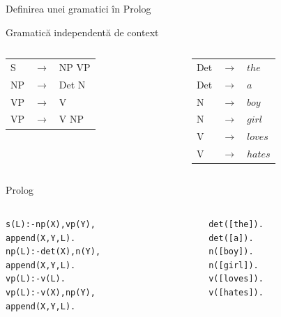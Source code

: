 \documentclass[xcolor=x11names,compress,10pt]{beamer}
\begin{document}
\begin{frame}{Definirea unei gramatici în Prolog}

\vspace*{0.5cm}

\begin{block}{Gramatică independentă de context}
\begin{columns}
\begin{column}{0.45\textwidth}
\begin{tabular}{lcl}
S &$\to$ & NP VP \\
NP &$\to$ &Det N \\
VP &$\to$ & V\\
VP &$\to$ & V NP\\

\end{tabular}
\end{column}
\begin{column}{0.45\textwidth}
\begin{tabular}{lcl}
Det &$\to$ & $the$\\
Det &$\to$ & $a$\\
N &$\to$ & $boy$\\
N &$\to$ & $girl$\\
V &$\to$ & $loves$\\
V &$\to$ &  $hates$
\end{tabular}
\end{column}
\end{columns}
\end{block}


\begin{block}{Prolog}
\begin{columns}
\begin{column}{0.55\textwidth}
\begin{alltt}
s(L) :- np(X), vp(Y),\\
\hspace*{1.4cm}  append(X,Y,L).\\
np(L) :- det(X), n(Y), \\
\hspace*{1.6cm} append(X,Y,L) .\\
vp(L) :- v(L).\\
vp(L):- v(X), np(Y),\\
\hspace*{1.4cm} append(X,Y,L) .\\
\end{alltt}
\end{column}
\begin{column}{0.35\textwidth}
\begin{alltt}
det([the]).\\ det([a]).\\
n([boy]). \\ n([girl]). \\
v([loves]).\\  v([hates]).
\end{alltt}
\end{column}
\end{columns}
\end{block}
\end{frame}
\end{document}
